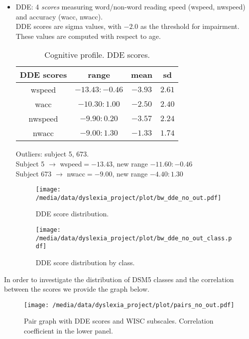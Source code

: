 \documentclass[11pt, a4paper, twoside, openright]{article}
\begin{document}
\begin{itemize}
\item DDE: 4 \emph{scores} measuring word/non-word reading speed
  (wspeed, nwspeed) and accuracy (wacc, nwacc).\\
  DDE scores are sigma values, with $-2.0$ as the threshold for
  impairment. These values are computed with respect to age.
\begin{table}[h!]
\begin{center}
  \begin{tabular}{|c|c|c|c|}
    \hline
    DDE scores & range & mean & sd\\
    \hline \hline
    wspeed & $-13.43:-0.46$ & $-3.93$ & $2.61$\\
    \hline
    wacc & $-10.30:1.00$ & $-2.50$ & $2.40$\\
    \hline
    nwspeed & $-9.90:0.20$ & $-3.57$ & $2.24$\\
    \hline
    nwacc & $-9.00:1.30$ & $-1.33$ & $1.74$\\
    \hline
  \end{tabular}
\end{center}
\caption{Cognitive profile. DDE scores.}
\label{tab:3}
\end{table}

Outliers: subject 5, 673.\\
Subject 5 $\longrightarrow$ wspeed$=-13.43$, new range $-11.60:-0.46$\\
Subject 673 $\longrightarrow$ nwacc$=-9.00$, new range $-4.40:1.30$

\begin{figure}[h!] 
\centering
\texttt{[image: /media/data/dyslexia\_project/plot/bw\_dde\_no\_out.pdf]}
\caption{DDE score distribution.}
\label{fig:4}
\end{figure}

\begin{figure}[h!] 
\centering
\texttt{[image: /media/data/dyslexia\_project/plot/bw\_dde\_no\_out\_class.pdf]}
\caption{DDE score distribution by class.}
\label{fig:5}
\end{figure}
\end{itemize}

\clearpage

In order to investigate the distribution of DSM5 classes and the
correlation between the scores we provide the graph below.
\begin{figure}[h!] 
\centering
\texttt{[image: /media/data/dyslexia\_project/plot/pairs\_no\_out.pdf]}
\caption{Pair graph with DDE scores and WISC subscales. Correlation coefficient in the lower panel.}
\label{fig:6}
\end{figure}
\end{document}
